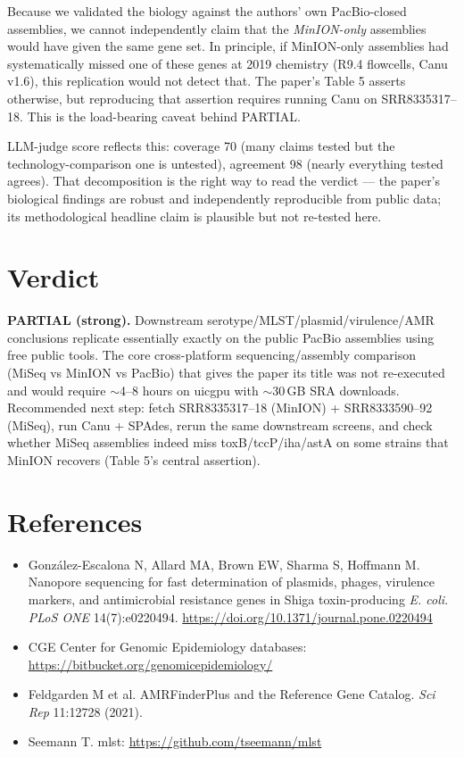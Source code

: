 \documentclass[11pt,letterpaper]{article}
\begin{document}
\begin{description}[leftmargin=1.2cm,style=nextline]
  \item[Reference-standard dependency.] Because we validated the biology against
    the authors' own PacBio-closed assemblies, we cannot independently claim that
    the \emph{MinION-only} assemblies would have given the same gene set. In
    principle, if MinION-only assemblies had systematically missed one of these
    genes at 2019 chemistry (R9.4 flowcells, Canu v1.6), this replication would
    not detect that. The paper's Table 5 asserts otherwise, but reproducing that
    assertion requires running Canu on SRR8335317--18. This is the load-bearing
    caveat behind PARTIAL.

  \item[Coverage vs agreement.] LLM-judge score reflects this: coverage 70
    (many claims tested but the technology-comparison one is untested), agreement
    98 (nearly everything tested agrees). That decomposition is the right way to
    read the verdict --- the paper's biological findings are robust and
    independently reproducible from public data; its methodological headline claim
    is plausible but not re-tested here.
\end{description}

\section{Verdict}
\textbf{PARTIAL (strong).} Downstream serotype/MLST/plasmid/virulence/AMR
conclusions replicate essentially exactly on the public PacBio assemblies using
free public tools. The core cross-platform sequencing/assembly comparison (MiSeq vs
MinION vs PacBio) that gives the paper its title was not re-executed and would
require $\sim$4--8 hours on uicgpu with $\sim$30\,GB SRA downloads. Recommended
next step: fetch SRR8335317--18 (MinION) + SRR8333590--92 (MiSeq), run Canu +
SPAdes, rerun the same downstream screens, and check whether MiSeq assemblies
indeed miss toxB/tccP/iha/astA on some strains that MinION recovers (Table 5's
central assertion).

\section{References}
\begin{itemize}[nosep]
\item Gonz\'alez-Escalona N, Allard MA, Brown EW, Sharma S, Hoffmann M.
  Nanopore sequencing for fast determination of plasmids, phages, virulence
  markers, and antimicrobial resistance genes in Shiga toxin-producing
  \textit{E. coli}. \emph{PLoS ONE} 14(7):e0220494.
  \url{https://doi.org/10.1371/journal.pone.0220494}
\item CGE Center for Genomic Epidemiology databases:
  \url{https://bitbucket.org/genomicepidemiology/}
\item Feldgarden M et al. AMRFinderPlus and the Reference Gene Catalog.
  \emph{Sci Rep} 11:12728 (2021).
\item Seemann T. mlst: \url{https://github.com/tseemann/mlst}
\end{itemize}
\end{document}
